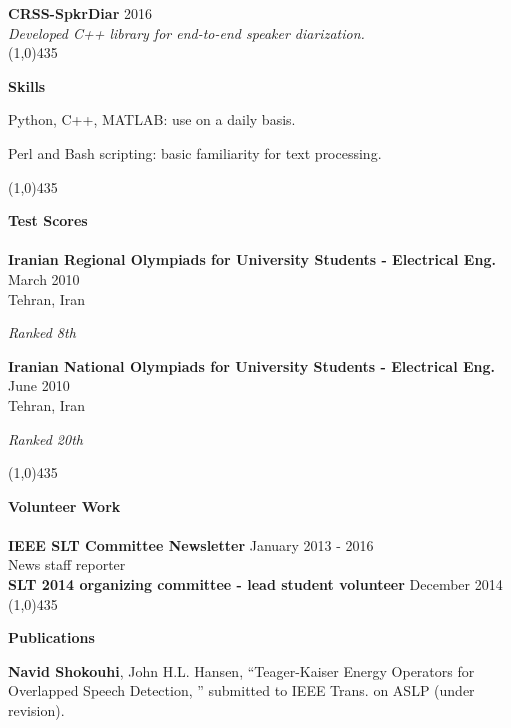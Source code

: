 	{\bf CRSS-SpkrDiar} \hfill { 2016}\\
	{\it Developed C++ library for end-to-end speaker diarization.}\\
	\line(1,0){435}
	
	\textbf{\sc Skills\\} 
	\begin{list2}
		\item Python, C++, MATLAB: use on a daily basis.
		\item Perl and Bash scripting: basic familiarity for text processing.
	\end{list2}
	\vspace{0mm}
	\line(1,0){435}
	
	\textbf{\sc Test Scores\\\\}
	{\bf Iranian Regional Olympiads for University Students - Electrical Eng.} \hfill {March 2010}\\
	Tehran, Iran
	\begin{list1}
	\item[] {\it Ranked 8th}
	\end{list1}
	\vspace{-0mm}
	{\bf Iranian National Olympiads for University Students - Electrical Eng.} \hfill {June 2010}\\
	Tehran, Iran
	\begin{list1}
	\vspace{-0mm}
	\item[] {\it Ranked 20th}
	\end{list1}
	\line(1,0){435}
	\vspace{0mm}
	
	\textbf{\sc Volunteer Work\\\\}
	\vspace{0mm}
	{\bf IEEE SLT Committee Newsletter} \hfill {January 2013 - 2016}\\
	News staff reporter\\
	
	{\bf SLT 2014 organizing committee - lead student volunteer} \hfill {December 2014}\\
	\vspace{0mm}
	\line(1,0){435}
	
	\textbf{\sc Publications\\}
	
	{\bf Navid Shokouhi}, John H.L. Hansen, ``Teager-Kaiser Energy Operators for Overlapped Speech Detection, '' submitted to IEEE Trans. on ASLP (under revision). \\
	
